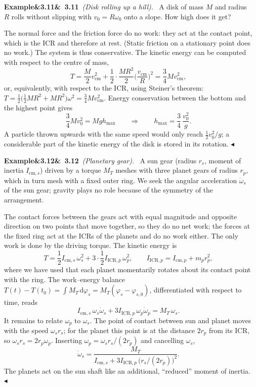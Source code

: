 \documentclass[11pt,a4paper,oneside]{report}
\numberwithin{equation}{chapter}
\newcommand{\dd}{\,\mathrm{d}}
\newcommand{\cm}{\mathrm{cm}}
\theoremstyle{plain}
\theoremstyle{definition}
\theoremstyle{remark}
\newenvironment{example}[2]{%
  \par\addvspace{\bigskipamount}\noindent
  \textbf{Example\ifx&#1&\else~#1\fi}\ \textit{(#2).}\ \ignorespaces}%
  {\hfill$\blacktriangleleft$\par\addvspace{\bigskipamount}}
\begin{document}
\begin{example}{3.11}{Disk rolling up a hill}
A disk of mass $M$ and radius $R$ rolls without slipping with $v_0=R\omega_0$ onto a slope. How high does it get?

The normal force and the friction force do no work: they act at the contact point, which is the ICR and therefore at
rest. (Static friction on a stationary point does no work.) The system is thus conservative. The kinetic energy can be
computed with respect to the centre of mass,
\[
  T=\frac M2v_\cm^2+\frac12\cdot\frac{MR^2}{2}\Big(\frac{v_\cm}R\Big)^2=\frac34Mv_\cm^2 ,
\]
or, equivalently, with respect to the ICR, using Steiner's theorem:
$T=\frac12\big(\frac12MR^2+MR^2\big)\omega^2=\frac34Mv_\cm^2$. Energy conservation between the bottom and the highest
point gives
\[
  \frac34Mv_0^2=Mgh_{\max}\qquad\Longrightarrow\qquad h_{\max}=\frac34\,\frac{v_0^2}g .
\]
A particle thrown upwards with the same speed would only reach $\frac12v_0^2/g$; a considerable part of the kinetic
energy of the disk is stored in its rotation.
\end{example}

\begin{example}{3.12}{Planetary gear}
A sun gear (radius $r_s$, moment of inertia $I_{\cm,s}$) driven by a torque $M_T$ meshes with three planet gears of radius
$r_p$, which in turn mesh with a fixed outer ring. We seek the angular acceleration $\dot\omega_s$ of the sun gear; gravity
plays no role because of the symmetry of the arrangement.

The contact forces between the gears act with equal magnitude and opposite direction on two points that move together,
so they do no net work; the forces at the fixed ring act at the ICRs of the planets and do no work either. The only work
is done by the driving torque. The kinetic energy is
\[
  T=\frac12I_{\cm,s}\,\omega_s^2+3\cdot\frac12I_{\text{ICR},p}\,\omega_p^2,\qquad I_{\text{ICR},p}=I_{\cm,p}+m_pr_p^2 ,
\]
where we have used that each planet momentarily rotates about its contact point with the ring. The work--energy
balance $T(t)-T(t_0)=\int M_T\dd\varphi_s=M_T(\varphi_s-\varphi_{s,0})$, differentiated with respect to time, reads
\[
  I_{\cm,s}\,\omega_s\dot\omega_s+3I_{\text{ICR},p}\,\omega_p\dot\omega_p=M_T\,\omega_s .
\]
It remains to relate $\omega_p$ to $\omega_s$. The point of contact between sun and planet moves with the speed
$\omega_sr_s$; for the planet this point is at the distance $2r_p$ from its ICR, so $\omega_sr_s=2r_p\omega_p$. Inserting
$\omega_p=\omega_sr_s/(2r_p)$ and cancelling $\omega_s$,
\[
  \dot\omega_s=\frac{M_T}{I_{\cm,s}+3I_{\text{ICR},p}\,\big(r_s/(2r_p)\big)^2}.
\]
The planets act on the sun shaft like an additional, ``reduced'' moment of inertia.
\end{example}
\end{document}
